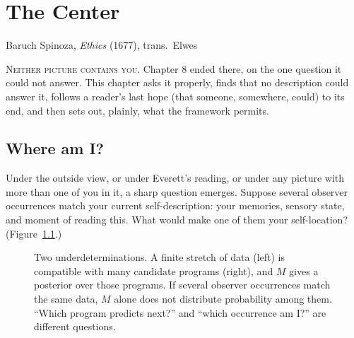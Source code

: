 \chapter{The Center}

{Baruch Spinoza, \textit{Ethics} (1677), trans.\ Elwes}

\noindent \textsc{Neither picture contains you.} Chapter 8 ended there, on the one question it could not answer. This chapter asks it properly, finds that no description could answer it, follows a reader's last hope (that someone, somewhere, could) to its end, and then sets out, plainly, what the framework permits.

\section*{Where am I?}

Under the outside view, or under Everett's reading, or under any picture with more than one of you in it, a sharp question emerges. Suppose several observer occurrences match your current self-description: your memories, sensory state, and moment of reading this. What would make one of them your self-location? (Figure~\ref{fig:where-am-i}.)

\begin{figure}[h]
\centering
{}
\caption{Two underdeterminations. A finite stretch of data (left) is compatible with many candidate programs (right), and $M$ gives a posterior over those programs. If several observer occurrences match the same data, $M$ alone does not distribute probability among them. ``Which program predicts next?'' and ``which occurrence am I?'' are different questions.}
\label{fig:where-am-i}
\end{figure}


